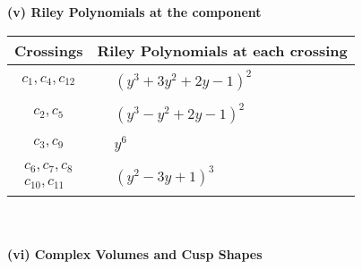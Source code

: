 \documentclass[1p]{elsarticle_modified}
\theoremstyle{definition}
\begin{document}
\newpage\renewcommand{\arraystretch}{1}
\flushleft \textbf{(v) Riley Polynomials at the component}\newline \\
\begin{tabular}{m{50pt}|m{274pt}}
Crossings & \hspace{64pt}Riley Polynomials at each crossing \\
\hline $$\begin{aligned}c_{1},c_{4},c_{12}\end{aligned}$$&$\begin{aligned}
&(y^3+3 y^2+2 y-1)^2
\end{aligned}$\\
\hline $$\begin{aligned}c_{2},c_{5}\end{aligned}$$&$\begin{aligned}
&(y^3- y^2+2 y-1)^2
\end{aligned}$\\
\hline $$\begin{aligned}c_{3},c_{9}\end{aligned}$$&$\begin{aligned}
&y^6
\end{aligned}$\\
\hline $$\begin{aligned}c_{6},c_{7},c_{8}\\c_{10},c_{11}\end{aligned}$$&$\begin{aligned}
&(y^2-3 y+1)^3
\end{aligned}$\\
\hline
\end{tabular}\\~\\
\newpage\flushleft \textbf{(vi) Complex Volumes and Cusp Shapes}
\end{document}
